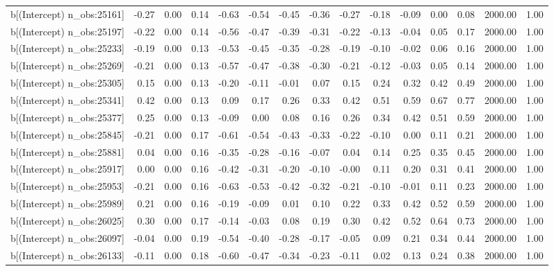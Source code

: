\begin{table}[ht]
\begin{tabular}{rrrrrrrrrrrrrrr}
  b[(Intercept) n\_obs:25161] & -0.27 & 0.00 & 0.14 & -0.63 & -0.54 & -0.45 & -0.36 & -0.27 & -0.18 & -0.09 & 0.00 & 0.08 & 2000.00 & 1.00 \\ 
  b[(Intercept) n\_obs:25197] & -0.22 & 0.00 & 0.14 & -0.56 & -0.47 & -0.39 & -0.31 & -0.22 & -0.13 & -0.04 & 0.05 & 0.17 & 2000.00 & 1.00 \\ 
  b[(Intercept) n\_obs:25233] & -0.19 & 0.00 & 0.13 & -0.53 & -0.45 & -0.35 & -0.28 & -0.19 & -0.10 & -0.02 & 0.06 & 0.16 & 2000.00 & 1.00 \\ 
  b[(Intercept) n\_obs:25269] & -0.21 & 0.00 & 0.13 & -0.57 & -0.47 & -0.38 & -0.30 & -0.21 & -0.12 & -0.03 & 0.05 & 0.14 & 2000.00 & 1.00 \\ 
  b[(Intercept) n\_obs:25305] & 0.15 & 0.00 & 0.13 & -0.20 & -0.11 & -0.01 & 0.07 & 0.15 & 0.24 & 0.32 & 0.42 & 0.49 & 2000.00 & 1.00 \\ 
  b[(Intercept) n\_obs:25341] & 0.42 & 0.00 & 0.13 & 0.09 & 0.17 & 0.26 & 0.33 & 0.42 & 0.51 & 0.59 & 0.67 & 0.77 & 2000.00 & 1.00 \\ 
  b[(Intercept) n\_obs:25377] & 0.25 & 0.00 & 0.13 & -0.09 & 0.00 & 0.08 & 0.16 & 0.26 & 0.34 & 0.42 & 0.51 & 0.59 & 2000.00 & 1.00 \\ 
  b[(Intercept) n\_obs:25845] & -0.21 & 0.00 & 0.17 & -0.61 & -0.54 & -0.43 & -0.33 & -0.22 & -0.10 & 0.00 & 0.11 & 0.21 & 2000.00 & 1.00 \\ 
  b[(Intercept) n\_obs:25881] & 0.04 & 0.00 & 0.16 & -0.35 & -0.28 & -0.16 & -0.07 & 0.04 & 0.14 & 0.25 & 0.35 & 0.45 & 2000.00 & 1.00 \\ 
  b[(Intercept) n\_obs:25917] & 0.00 & 0.00 & 0.16 & -0.42 & -0.31 & -0.20 & -0.10 & -0.00 & 0.11 & 0.20 & 0.31 & 0.41 & 2000.00 & 1.00 \\ 
  b[(Intercept) n\_obs:25953] & -0.21 & 0.00 & 0.16 & -0.63 & -0.53 & -0.42 & -0.32 & -0.21 & -0.10 & -0.01 & 0.11 & 0.23 & 2000.00 & 1.00 \\ 
  b[(Intercept) n\_obs:25989] & 0.21 & 0.00 & 0.16 & -0.19 & -0.09 & 0.01 & 0.10 & 0.22 & 0.33 & 0.42 & 0.52 & 0.59 & 2000.00 & 1.00 \\ 
  b[(Intercept) n\_obs:26025] & 0.30 & 0.00 & 0.17 & -0.14 & -0.03 & 0.08 & 0.19 & 0.30 & 0.42 & 0.52 & 0.64 & 0.73 & 2000.00 & 1.00 \\ 
  b[(Intercept) n\_obs:26097] & -0.04 & 0.00 & 0.19 & -0.54 & -0.40 & -0.28 & -0.17 & -0.05 & 0.09 & 0.21 & 0.34 & 0.44 & 2000.00 & 1.00 \\ 
  b[(Intercept) n\_obs:26133] & -0.11 & 0.00 & 0.18 & -0.60 & -0.47 & -0.34 & -0.23 & -0.11 & 0.02 & 0.13 & 0.24 & 0.38 & 2000.00 & 1.00 \\ 

\end{tabular}
\end{table}
